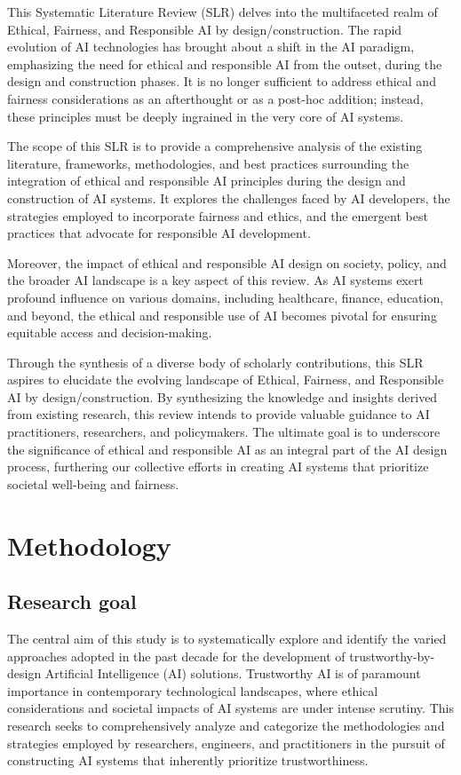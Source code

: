\documentclass{article}
\begin{document}
This Systematic Literature Review (SLR) delves into the multifaceted realm of Ethical, Fairness, and Responsible AI by design/construction. The rapid evolution of AI technologies has brought about a shift in the AI paradigm, emphasizing the need for ethical and responsible AI from the outset, during the design and construction phases. It is no longer sufficient to address ethical and fairness considerations as an afterthought or as a post-hoc addition; instead, these principles must be deeply ingrained in the very core of AI systems.  

The scope of this SLR is to provide a comprehensive analysis of the existing literature, frameworks, methodologies, and best practices surrounding the integration of ethical and responsible AI principles during the design and construction of AI systems. It explores the challenges faced by AI developers, the strategies employed to incorporate fairness and ethics, and the emergent best practices that advocate for responsible AI development.  

Moreover, the impact of ethical and responsible AI design on society, policy, and the broader AI landscape is a key aspect of this review. As AI systems exert profound influence on various domains, including healthcare, finance, education, and beyond, the ethical and responsible use of AI becomes pivotal for ensuring equitable access and decision-making.  

Through the synthesis of a diverse body of scholarly contributions, this SLR aspires to elucidate the evolving landscape of Ethical, Fairness, and Responsible AI by design/construction. By synthesizing the knowledge and insights derived from existing research, this review intends to provide valuable guidance to AI practitioners, researchers, and policymakers. The ultimate goal is to underscore the significance of ethical and responsible AI as an integral part of the AI design process, furthering our collective efforts in creating AI systems that prioritize societal well-being and fairness.

\newpage
\section{Methodology}

\subsection{Research goal}

The central aim of this study is to systematically explore and identify the varied approaches adopted in the past decade for the development of trustworthy-by-design Artificial Intelligence (AI) solutions. Trustworthy AI is of paramount importance in contemporary technological landscapes, where ethical considerations and societal impacts of AI systems are under intense scrutiny. This research seeks to comprehensively analyze and categorize the methodologies and strategies employed by researchers, engineers, and practitioners in the pursuit of constructing AI systems that inherently prioritize trustworthiness.
\end{document}

